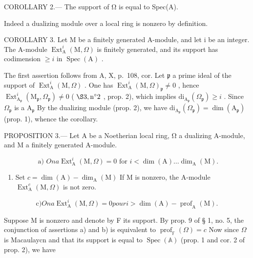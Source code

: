 COROLLARY 2.--- The support of Ω is equal to Spec(A).

Indeed a dualizing module over a local ring is nonzero by definition.

COROLLARY 3. Let M be a finitely generated A-module, and let i be an integer. The A-module \(\operatorname{Ext}_{\mathrm{A}}^{i}(\mathrm{M},\Omega)\) is finitely generated, and its support has codimension \(\geqslant i\) in \(\operatorname{Spec}(\mathrm{A})\) .

The first assertion follows from A, X, p.~108, cor. Let \(\mathfrak{p}\) a prime ideal of the support of \(\operatorname{Ext}_{\mathrm{A}}^{i}(\mathrm{M},\Omega)\) . One has \(\operatorname{Ext}_{\mathrm{A}}^{i}(\mathrm{M},\Omega)_{\mathfrak{p}} \neq 0\) , hence \(\operatorname{Ext}_{\mathrm{A}_{\mathfrak{p}}}^{i}(\mathrm{M}_{\mathfrak{p}},\Omega_{\mathfrak{p}}) \neq 0\) ( \(\S 3, \mathrm{n}^{\circ}2\) , prop. 2), which implies \(\mathrm{di}_{\mathrm{A}_{\mathfrak{p}}}(\Omega_{\mathfrak{p}}) \geqslant i\) . Since \(\Omega_{\mathfrak{p}}\) is a \(\mathrm{A}_{\mathfrak{p}}\) By the dualizing module (prop. 2), we have \(\mathrm{di}_{\mathrm{A}_{\mathfrak{p}}}(\Omega_{\mathfrak{p}}) = \dim(\mathrm{A}_{\mathfrak{p}})\) (prop. 1), whence the corollary.

PROPOSITION 3.--- Let A be a Noetherian local ring, Ω a dualizing A-module, and M a finitely generated A-module.

\[
\text { a) } O n a \operatorname{Ext} _ {\mathrm{A}} ^ {i} (\mathrm{M}, \Omega) = 0 \text { for } i <   \dim (\mathrm{A}) \dots \dim_ {\mathrm{A}} (\mathrm{M}).
\]

\begin{enumerate}
\def\labelenumi{\alph{enumi})}
\setcounter{enumi}{1}
\tightlist
\item
  Set \(c = \dim(\mathrm{A}) - \dim_{\mathrm{A}}(\mathrm{M})\) If M is nonzero, the A-module \(\operatorname{Ext}_{\mathrm{A}}^{c}(\mathrm{M}, \Omega)\) is not zero.
\end{enumerate}

\[
\mathrm{c)} O n a \operatorname{Ext} _ {\mathrm{A}} ^ {i} (\mathrm{M}, \Omega) = 0 p o u r i > \dim (\mathrm{A}) - \operatorname{prof} _ {\mathrm{A}} (\mathrm{M}).
\]

Suppose M is nonzero and denote by F its support. By prop. 9 of § 1, no. 5, the conjunction of assertions a) and b) is equivalent to \(\operatorname{prof}_{\mathbb{F}}(\Omega)=c\) Now since \(\Omega\) is Macaulaycn and that its support is equal to \(\operatorname{Spec}(\mathbb{A})\) (prop. 1 and cor. 2 of prop. 2), we have

